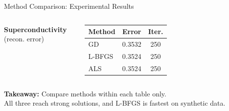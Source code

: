 \documentclass[aspectratio=169,usenames,dvipsnames]{beamer}
\begin{document}
\begin{frame}{Method Comparison: Experimental Results}
\begin{columns}[T,onlytextwidth]
\vspace{0.16cm}
{\scriptsize \textbf{Superconductivity} (recon. error)}

\vspace{0.03cm}
\scriptsize
\begin{tabular}{lcc}
\toprule
\textbf{Method} & \textbf{Error} & \textbf{Iter.} \\
\midrule
GD & 0.3532 & 250 \\
L-BFGS & 0.3524 & 250 \\
ALS & 0.3524 & 250 \\
\bottomrule
\end{tabular}
\end{columns}

\vspace{0.12cm}
\footnotesize
\textbf{Takeaway:} Compare methods within each table only. \\ 

All three reach strong solutions, and L-BFGS is fastest on synthetic data.
\end{frame}
\end{document}
